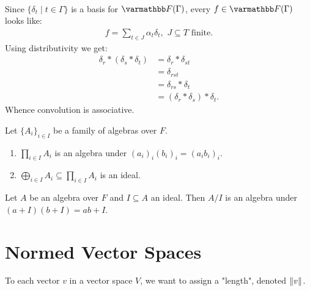 \begin{example}
\begin{equation*}
\begin{split}
            \end{split}
            \end{equation*}
        Since $\{\delta_t \mid t \in \Gamma\}$ is a basis for $\bfF(\Gamma)$, every $f \in \bfF(\Gamma)$ looks like:
            \begin{equation*}
            \begin{split}
                f = \sum_{t \in J}\alpha_t \delta_t , \hspace{4pt}J \subseteq T \hspace{4pt}\text{finite}.
            \end{split}
            \end{equation*}
        Using distributivity we get:
            \begin{equation*}
            \begin{split}
                \delta_r \ast (\delta_s \ast \delta_t)
                & = \delta_r \ast \delta_{st} \\
                & = \delta_{rst} \\
                & = \delta_{rs} \ast \delta_t \\
                & = (\delta_r \ast \delta_s) \ast \delta_t.
            \end{split}
            \end{equation*}
        Whence convolution is associative.
    \end{example}

    \begin{exercise}
        Let $\{A_i\}_{i \in I}$ be a family of algebras over $F$.
        \begin{enumerate}[label = (\arabic*),itemsep=1pt,topsep=3pt]
            \item $\prod_{i \in I}A_i$ is an algebra under $(a_i)_i(b_i)_i = (a_ib_i)_i$.
            \item $\bigoplus_{i \in I}A_i \subseteq \prod_{i \in I}A_i$ is an ideal.
        \end{enumerate}
    \end{exercise}
    \begin{exercise}
        Let $A$ be an algebra over $F$ and $I \subseteq A$ an ideal. Then $A/I$ is an algebra under $(a+I)(b+I) = ab+I$.
    \end{exercise}

\section{Normed Vector Spaces}
    To each vector $v$ in a vector space $V$, we want to assign a "length", denoted $\left\lVert v \right\rVert$.

